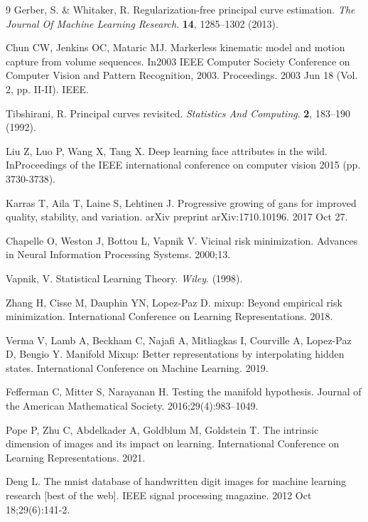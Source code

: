 \documentclass{article}
\begin{document}
\begin{thebibliography}{9}
Gerber, S. \& Whitaker, R. Regularization-free principal curve estimation. 
{\em The Journal Of Machine Learning Research}.
 \textbf{14}, 1285--1302 (2013).
 
Chun CW, Jenkins OC, Mataric MJ. Markerless kinematic model and motion capture from volume sequences. In2003 IEEE Computer Society Conference on Computer Vision and Pattern Recognition, 2003. Proceedings. 2003 Jun 18 (Vol. 2, pp. II-II). IEEE.

Tibshirani, R. Principal curves revisited. 
{\em Statistics And Computing}.
 \textbf{2}, 183--190 (1992).
 
Liu Z, Luo P, Wang X, Tang X. Deep learning face attributes in the wild. InProceedings of the IEEE international conference on computer vision 2015 (pp. 3730-3738).

Karras T, Aila T, Laine S, Lehtinen J. Progressive growing of gans for improved quality, stability, and variation. arXiv preprint arXiv:1710.10196. 2017 Oct 27.

Chapelle O, Weston J, Bottou L, Vapnik V. Vicinal risk minimization. Advances in Neural Information Processing Systems. 2000;13.

Vapnik, V. Statistical Learning Theory.
{\em Wiley}. (1998).

Zhang H, Cisse M, Dauphin YN, Lopez-Paz D. mixup: Beyond empirical risk minimization. International Conference on Learning Representations. 2018.

Verma V, Lamb A, Beckham C, Najafi A, Mitliagkas I, Courville A, Lopez-Paz D, Bengio Y. Manifold Mixup: Better representations by interpolating hidden states. International Conference on Machine Learning. 2019.

Fefferman C, Mitter S, Narayanan H. Testing the manifold hypothesis. Journal of the American Mathematical Society. 2016;29(4):983--1049.

Pope P, Zhu C, Abdelkader A, Goldblum M, Goldstein T. The intrinsic dimension of images and its impact on learning. International Conference on Learning Representations. 2021.

Deng L. The mnist database of handwritten digit images for machine learning research [best of the web]. IEEE signal processing magazine. 2012 Oct 18;29(6):141-2.


\end{thebibliography}
\end{document}
